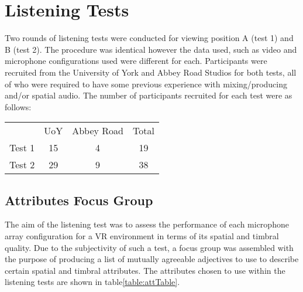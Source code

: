\section{Listening Tests}

	Two rounds of listening tests were conducted for viewing position A (test 1) and B (test 2). The procedure was identical however the data used, such as video and microphone configurations used were different for each. Participants were recruited from the University of York and Abbey Road Studios for both tests, all of who were required to have some previous experience with mixing/producing and/or spatial audio. The number of participants recruited for each test were as follows:

	\vspace{5pt}
	\begin{tabular}{l c c c}
		& UoY & Abbey Road & Total\\ 
		Test 1 & 15 & 4 & 19\\ 
		Test 2 & 29 & 9 & 38\\ 
	\end{tabular}

	\subsection{Attributes Focus Group}
		The aim of the listening test was to assess the performance of each microphone array configuration for a VR environment in terms of its spatial and timbral quality. Due to the subjectivity of such a test, a focus group was assembled with the purpose of producing a list of mutually agreeable adjectives to use to describe certain spatial and timbral attributes. The attributes chosen to use within the listening tests are shown in table\ref{table:attTable}. \\

